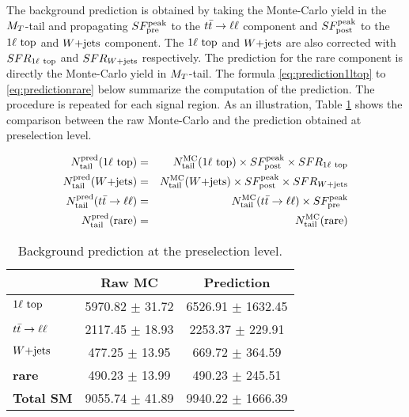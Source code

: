         The background prediction is obtained by taking the Monte-Carlo yield in the $M_T$-tail and propagating $SF_{\text{pre}}^{\text{peak}}$ to the $t\bar{t} \rightarrow \ell \ell$ component and $SF_{\text{post}}^{\text{peak}}$ to the $1\ell~\text{top}$ and $\text{$W$+jets}$ component. The $1\ell~\text{top}$ and $\text{$W$+jets}$ are also corrected with $SFR_{1\ell~\text{top}}$ and $SFR_{\text{$W$+jets}}$ respectively. The prediction for the rare component is directly the Monte-Carlo yield in $M_T$-tail. The formula \ref{eq:prediction1ltop} to \ref{eq:predictionrare} below summarize the computation of the prediction. The procedure is repeated for each signal region. As an illustration, Table \ref{tab:predictionPreselection} shows the comparison between the raw Monte-Carlo and the prediction obtained at preselection level.

        \begin{eqnarray}
            N^\text{pred}_\text{tail}(1\ell~\text{top}) & = & N^\text{MC}_\text{tail}(1\ell~\text{top})  \times SF_{\text{post}}^{\text{peak}} \times SFR_{1\ell~\text{top}} \label{eq:prediction1ltop}  \\
            N^\text{pred}_\text{tail}(\text{$W$+jets})        & = & N^\text{MC}_\text{tail}(\text{$W$+jets})         \times SF_{\text{post}}^{\text{peak}}  \times SFR_{\text{$W$+jets}}                             \\
            N^\text{pred}_\text{tail}(t\bar{t} \rightarrow \ell \ell)  & = & N^\text{MC}_\text{tail}(t\bar{t} \rightarrow \ell \ell)   \times SF_{\text{pre}}^{\text{peak}}                                                \\
            N^\text{pred}_\text{tail}(\text{rare})   & = & N^\text{MC}_\text{tail}(\text{rare})                                           \label{eq:predictionrare} 
        \end{eqnarray}

        \begin{table}[!h]
            \begin{center}
                \begin{tabular}{|l|c|c|}
                    \hline
                                             &  \textbf{Raw MC}          & \textbf{Prediction}       \\
                    \hline
                    \textbf{$1\ell~\text{top}$} &  5970.82 $\pm$ 31.72      & 6526.91 $\pm$ 1632.45     \\
                    \textbf{$t\bar{t} \rightarrow \ell \ell$}  &  2117.45 $\pm$ 18.93      & 2253.37 $\pm$ 229.91      \\
                    \textbf{$\text{$W$+jets}$}        &  477.25  $\pm$ 13.95       & 669.72 $\pm$ 364.59       \\
                    \textbf{rare}            &  490.23  $\pm$ 13.99       & 490.23 $\pm$ 245.51       \\
                    \hline
                    \textbf{Total SM}        &  9055.74 $\pm$ 41.89      & 9940.22 $\pm$ 1666.39     \\
                    \hline
                \end{tabular}
                \caption{ Background prediction at the preselection level.}
                \label{tab:predictionPreselection}
            \end{center}
        \end{table}

